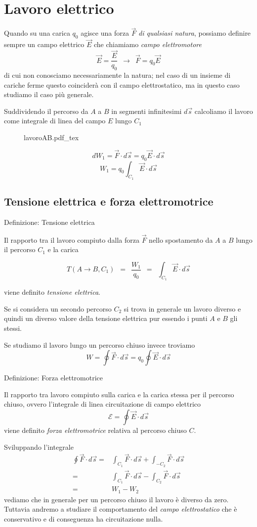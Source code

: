\documentclass[x11names]{report}
\newcommand{\definizione}[2]{
	\begin{center}
		\fboxsep11pt
		\colorbox{myblue}{\begin{minipage}{5.75in}
				\begin{blues}{Definizione: #1}
					#2
				\end{blues}
		\end{minipage}}
	\end{center}
}
\newcommand{\incfig}[1]{%
	{#1.pdf_tex}
}
\begin{document}
\section{Lavoro elettrico}
Quando su una carica \(q_0\) agisce una forza \(\vec{F}\) \textit{di qualsiasi natura}, possiamo definire sempre un campo elettrico \(\vec{E}\) che chiamiamo \textit{campo elettromotore}
\[
\vec{E} = \frac{\vec{E}}{q_0} \;\ \to \;\ \vec{F} = q_0 \vec{E}
\]
di cui non conosciamo necessariamente la natura; nel caso di un insieme di cariche ferme questo coinciderà con il campo elettrostatico, ma in questo caso studiamo il caso più generale.

Suddividendo il percorso da \(A\) a \(B\) in segmenti infinitesimi \(d\vec{s}\) calcoliamo il lavoro come integrale di linea del campo \(E\) lungo \(C_1\) 
\begin{figure}[h]
	\centering
	\incfig{lavoroAB}
\end{figure}

\[
dW_1 = \vec{F}\cdot d\vec{s} = q_0\vec{E} \cdot d\vec{s}
\]
\[
 W_1 =  q_0 \int_{C_1} \vec{E} \cdot d\vec{s}
\]

\subsection{Tensione elettrica e forza elettromotrice}
\definizione{Tensione elettrica}{
Il rapporto tra il lavoro compiuto dalla forza \(\vec{F}\) nello spostamento da \(A\) a \(B\) lungo il percorso \(C_1\) e la carica 


\begin{equation}
	T(A\to B,C_1) \;\ = \;\ \frac{W_1}{q_0} \;\ =\;\ \int_{C_1}\vec{E}\cdot d\vec{s}
\end{equation}

viene definito \textit{tensione elettrica}.
}
Se si considera un secondo percorso \(C_2\) si trova in generale un lavoro diverso e quindi un diverso valore della tensione elettrica pur essendo i punti \(A\) e \(B\) gli stessi.


Se studiamo il lavoro lungo un percorso chiuso invece troviamo
\[
W = \oint \vec{F} \cdot d\vec{s} = q_0\oint\vec{E}\cdot d\vec{s}
\]
\definizione{Forza elettromotrice}{
Il rapporto tra lavoro compiuto sulla carica e la carica stessa per il percorso chiuso, ovvero l'integrale di linea circuitazione di campo elettrico
\begin{equation}
\mathcal{E} = \oint\vec{E}\cdot d\vec{s}
\end{equation}
viene definito \textit{forza elettromotrice} relativa al percorso chiuso \(C\).
}
Sviluppando l'integrale
\begin{align*}
	\oint\vec{F}\cdot d\vec{s} =& \int_{C_1}\vec{F}\cdot d\vec{s} + \int_{-C_2}\vec{F}\cdot d\vec{s} \\
							   =& \int_{C_1}\vec{F}\cdot d\vec{s} - \int_{C_2}\vec{F}\cdot d\vec{s} \\
							   =& W_1 - W_2
\end{align*}
vediamo che in generale per un percorso chiuso il lavoro è diverso da zero. Tuttavia andremo a studiare il comportamento del \textit{campo elettrostatico} che è conservativo e di conseguenza ha circuitazione nulla. 
\end{document}
